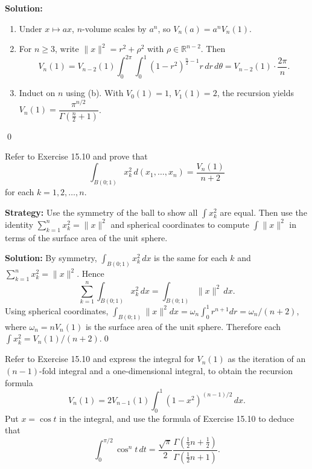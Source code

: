 \bigskip\noindent\textbf{Solution:}
\begin{enumerate}[label=(\alph*)]
\item Under \(x\mapsto ax\), \(n\)-volume scales by \(a^n\), so \(V_n(a)=a^n V_n(1)\).
\item For \(n\ge 3\), write \(\|x\|^2=r^2+\rho^2\) with \(\rho\in\mathbb{R}^{n-2}\). Then
\[
V_n(1)=V_{n-2}(1)\int_0^{2\pi}\!\int_0^1 (1-r^2)^{\frac{n}{2}-1} r\,dr\,d\theta = V_{n-2}(1)\cdot \frac{2\pi}{n}.
\]
\item Induct on \(n\) using (b). With \(V_0(1)=1\), \(V_1(1)=2\), the recursion yields \(V_n(1)=\dfrac{\pi^{n/2}}{\Gamma(\tfrac{n}{2}+1)}\).
\end{enumerate}\qed


\begin{problembox}
\begin{problemstatement}
Refer to Exercise 15.10 and prove that
\[
\int_{B(0;1)} x_k^2 \, d(x_1, \ldots, x_n) = \frac{V_n(1)}{n + 2}
\]
for each \( k = 1, 2, \ldots, n \).
\end{problemstatement}
\end{problembox}

\noindent\textbf{Strategy:} Use the symmetry of the ball to show all \(\int x_k^2\) are equal. Then use the identity \(\sum_{k=1}^n x_k^2 = \|x\|^2\) and spherical coordinates to compute \(\int \|x\|^2\) in terms of the surface area of the unit sphere.

\bigskip\noindent\textbf{Solution:}
By symmetry, \(\int_{B(0;1)} x_k^2\,dx\) is the same for each \(k\) and \(\sum_{k=1}^n x_k^2=\|x\|^2\). Hence
\[
\sum_{k=1}^n \int_{B(0;1)} x_k^2\,dx = \int_{B(0;1)} \|x\|^2\,dx.
\]
Using spherical coordinates, \(\int_{B(0;1)} \|x\|^2 dx = \omega_{n}\int_0^1 r^{n+1}dr=\omega_n/(n+2)\), where \(\omega_n= n V_n(1)\) is the surface area of the unit sphere. Therefore each \(\int x_k^2 = V_n(1)/(n+2)\).\qed


\begin{problembox}
\begin{problemstatement}
Refer to Exercise 15.10 and express the integral for \( V_n(1) \) as the iteration of an \( (n - 1) \)-fold integral and a one-dimensional integral, to obtain the recursion formula
\[
V_n(1) = 2V_{n-1}(1) \int_0^1 (1 - x^2)^{(n-1)/2} \, dx.
\]
Put \( x = \cos t \) in the integral, and use the formula of Exercise 15.10 to deduce that
\[
\int_0^{\pi/2} \cos^n t \, dt = \frac{\sqrt{\pi}}{2} \frac{\Gamma(\frac{1}{2}n + \frac{1}{2})}{\Gamma(\frac{1}{2}n + 1)}.
\]
\end{problemstatement}
\end{problembox}

